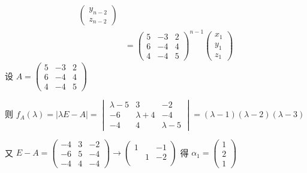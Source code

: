 \begin{align*}
\begin{pmatrix}
                                                                        y_{n-2} \\
                                                                        z_{n-2}
                                                                    \end{pmatrix}   \\
                                               & = \begin{pmatrix}
                                                       5 & -3 & 2 \\
                                                       6 & -4 & 4 \\
                                                       4 & -4 & 5
                                                   \end{pmatrix}^{n-1}\begin{pmatrix}
                                                                          x_{1} \\
                                                                          y_{1} \\
                                                                          z_{1}
                                                                      \end{pmatrix}
         \end{align*}
         设 \( A = \begin{pmatrix}
             5 & -3 & 2 \\
             6 & -4 & 4 \\
             4 & -4 & 5
         \end{pmatrix} \)

         则 \( f_{A}(\lambda) = |\lambda E - A| = \begin{vmatrix}
             \lambda-5 & 3         & -2        \\
             -6        & \lambda+4 & -4        \\
             -4        & 4         & \lambda-5
         \end{vmatrix} = (\lambda-1)(\lambda-2)(\lambda-3) \)

         又 \( E-A = \begin{pmatrix}
             -4 & 3 & -2 \\
             -6 & 5 & -4 \\
             -4 & 4 & -4
         \end{pmatrix} \rightarrow \begin{pmatrix}
             1 &   & -1 \\
               & 1 & -2 \\
               &   &
         \end{pmatrix} \) 得 \( \alpha_{1} = \begin{pmatrix}
             1 \\
             2 \\
             1
         \end{pmatrix} \)

